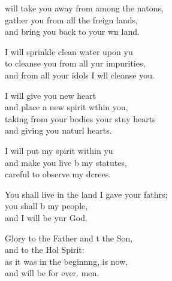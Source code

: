 \settowidth{\versewidth}{You shall live in the land I gave your fathers; +}
\begin{psalmverse}%
  \begin{patverse}
 will take you away from among the nat\pointup{\i}ons,\Flex\\
gather you from all the freign lands,\Med\\
and bring you back to your wn land.

I will sprinkle clean water upon yu\Flex\\
to cleanse you from all yur impurities,\Med\\
and from all your idols I w\pointup{\i}ll cleanse you.

I will give you  new heart\Med\\
and place a new spirit w\pointup{\i}thin you,\\
taking from your bodies your stny hearts\Med\\
and giving you naturl hearts.

I will put my spirit within yu\Flex\\
and make you live b my statutes,\Med\\
careful to observe my dcrees.

You shall live in the land I gave your fathrs;\Flex\\
you shall b my people,\Med\\
and I will be yur God.

Glory to the Father and t the Son,\Med\\
and to the Hol Spirit:\\
as it was in the beginn\pointup{\i}ng, is now,\Med\\
and will be for ever. men.
  \end{patverse}
  \end{psalmverse}
